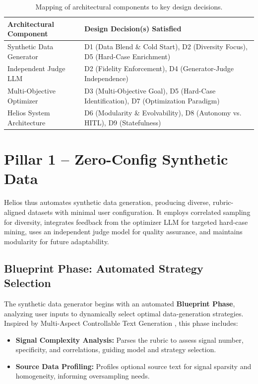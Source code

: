\documentclass{article}
\begin{document}
\begin{table}[h]
  \centering
  \caption{Mapping of architectural components to key design decisions.}
  \label{tab:components_vs_decisions}
  \begin{tabular}{p{4.5cm} p{8cm}}
    \toprule
    \textbf{Architectural Component} & \textbf{Design Decision(s) Satisfied}                                                \\
    \midrule
    Synthetic Data Generator         & D1 (Data Blend \& Cold Start), D2 (Diversity Focus), D5 (Hard-Case Enrichment)       \\
    \addlinespace
    Independent Judge LLM            & D2 (Fidelity Enforcement), D4 (Generator-Judge Independence)                         \\
    \addlinespace
    Multi-Objective Optimizer        & D3 (Multi-Objective Goal), D5 (Hard-Case Identification), D7 (Optimization Paradigm) \\
    \addlinespace
    Helios System Architecture       & D6 (Modularity \& Evolvability), D8 (Autonomy vs. HITL), D9 (Statefulness)           \\
    \bottomrule
  \end{tabular}
\end{table}

\section{Pillar 1 – Zero-Config Synthetic Data}
\label{sec:autofoundry}
Helios thus automates synthetic data generation, producing diverse, rubric-aligned datasets with minimal user configuration. It employs correlated sampling for diversity, integrates feedback from the optimizer LLM for targeted hard-case mining, uses an independent judge model for quality assurance, and maintains modularity for future adaptability.

\subsection{Blueprint Phase: Automated Strategy Selection}
The synthetic data generator begins with an automated \textbf{Blueprint Phase}, analyzing user inputs to dynamically select optimal data-generation strategies. Inspired by Multi-Aspect Controllable Text Generation \citep{zhang2024lightweightmultiaspectcontrolled}, this phase includes:

\begin{itemize}[noitemsep]
  \item \textbf{Signal Complexity Analysis:} Parses the rubric to assess signal number, specificity, and correlations, guiding model and strategy selection.
  \item \textbf{Source Data Profiling:} Profiles optional source text for signal sparsity and homogeneity, informing oversampling needs.
\end{itemize}
\end{document}
